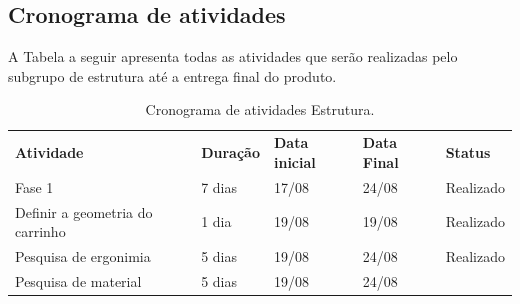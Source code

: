 \subsection{Cronograma de atividades}

A Tabela a seguir apresenta todas as atividades que serão realizadas pelo subgrupo de estrutura até a entrega final do produto.

\clearpage

\begin{table}[H]
 \centering
 {\renewcommand\arraystretch{1.25}
 \label{tab:cronestr}
 \caption{Cronograma de atividades Estrutura.}
 \begin{tabular}{ l l l l l }
  \cline{1-1}\cline{2-2}\cline{3-3}\cline{4-4}\cline{5-5}  
    \multicolumn{1}{|p{3.867cm}|}{\textbf{Atividade} \centering } &
    \multicolumn{1}{p{1.700cm}|}{\textbf{Duração} \centering } &
    \multicolumn{1}{p{1.133cm}|}{\textbf{Data inicial} \centering } &
    \multicolumn{1}{p{0.967cm}|}{\textbf{Data Final} \centering } &
    \multicolumn{1}{p{1.833cm}|}{\textbf{Status} \centering }
  \\  
  \cline{1-1}\cline{2-2}\cline{3-3}\cline{4-4}\cline{5-5}  
    \multicolumn{1}{|p{3.867cm}|}{Fase 1} &
    \multicolumn{1}{p{1.700cm}|}{7 dias \centering } &
    \multicolumn{1}{p{1.133cm}|}{17/08 \centering } &
    \multicolumn{1}{p{0.967cm}|}{24/08 \centering } &
    \multicolumn{1}{p{1.833cm}|}{Realizado \centering }
  \\  
  \cline{1-1}\cline{2-2}\cline{3-3}\cline{4-4}\cline{5-5}  
    \multicolumn{1}{|p{3.867cm}|}{Definir a geometria do carrinho} &
    \multicolumn{1}{p{1.700cm}|}{1 dia \centering } &
    \multicolumn{1}{p{1.133cm}|}{19/08 \centering } &
    \multicolumn{1}{p{0.967cm}|}{19/08 \centering } &
    \multicolumn{1}{p{1.833cm}|}{Realizado \centering }
  \\  
  \cline{1-1}\cline{2-2}\cline{3-3}\cline{4-4}\cline{5-5}  
    \multicolumn{1}{|p{3.867cm}|}{Pesquisa de ergonimia} &
    \multicolumn{1}{p{1.700cm}|}{5 dias \centering } &
    \multicolumn{1}{p{1.133cm}|}{19/08 \centering } &
    \multicolumn{1}{p{0.967cm}|}{24/08 \centering } &
    \multicolumn{1}{p{1.833cm}|}{Realizado \centering }
  \\  
  \cline{1-1}\cline{2-2}\cline{3-3}\cline{4-4}\cline{5-5}  
    \multicolumn{1}{|p{3.867cm}|}{Pesquisa de material } &
    \multicolumn{1}{p{1.700cm}|}{5 dias \centering } &
    \multicolumn{1}{p{1.133cm}|}{ 19/08 \centering } &
    \multicolumn{1}{p{0.967cm}|}{24/08 \centering } &

\end{tabular}}
\end{table}
